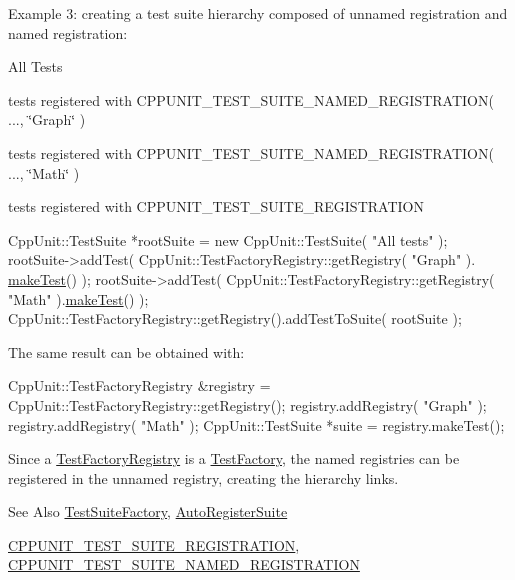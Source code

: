 Example 3\-: creating a test suite hierarchy composed of unnamed registration and named registration\-:
\begin{DoxyItemize}
\item All Tests
\begin{DoxyItemize}
\item tests registered with C\-P\-P\-U\-N\-I\-T\-\_\-\-T\-E\-S\-T\-\_\-\-S\-U\-I\-T\-E\-\_\-\-N\-A\-M\-E\-D\-\_\-\-R\-E\-G\-I\-S\-T\-R\-A\-T\-I\-O\-N( ..., \char`\"{}\-Graph\char`\"{} )
\item tests registered with C\-P\-P\-U\-N\-I\-T\-\_\-\-T\-E\-S\-T\-\_\-\-S\-U\-I\-T\-E\-\_\-\-N\-A\-M\-E\-D\-\_\-\-R\-E\-G\-I\-S\-T\-R\-A\-T\-I\-O\-N( ..., \char`\"{}\-Math\char`\"{} )
\item tests registered with C\-P\-P\-U\-N\-I\-T\-\_\-\-T\-E\-S\-T\-\_\-\-S\-U\-I\-T\-E\-\_\-\-R\-E\-G\-I\-S\-T\-R\-A\-T\-I\-O\-N
\end{DoxyItemize}
\end{DoxyItemize}


\begin{DoxyCode}
CppUnit::TestSuite *rootSuite = \textcolor{keyword}{new} CppUnit::TestSuite( \textcolor{stringliteral}{"All tests"} );
rootSuite->addTest( CppUnit::TestFactoryRegistry::getRegistry( \textcolor{stringliteral}{"Graph"} ).
      \hyperlink{class_test_factory_registry_a75fd01e6d565fb0f576ed1a887655089}{makeTest}() );
rootSuite->addTest( CppUnit::TestFactoryRegistry::getRegistry( \textcolor{stringliteral}{"Math"} ).\hyperlink{class_test_factory_registry_a75fd01e6d565fb0f576ed1a887655089}{makeTest}() );
CppUnit::TestFactoryRegistry::getRegistry().addTestToSuite( rootSuite );
\end{DoxyCode}


The same result can be obtained with\-: 
\begin{DoxyCode}
CppUnit::TestFactoryRegistry &registry = CppUnit::TestFactoryRegistry::getRegistry();
registry.addRegistry( \textcolor{stringliteral}{"Graph"} );
registry.addRegistry( \textcolor{stringliteral}{"Math"} );
CppUnit::TestSuite *suite = registry.makeTest();
\end{DoxyCode}


Since a \hyperlink{class_test_factory_registry}{Test\-Factory\-Registry} is a \hyperlink{class_test_factory}{Test\-Factory}, the named registries can be registered in the unnamed registry, creating the hierarchy links.

\begin{DoxySeeAlso}{See Also}
\hyperlink{class_test_suite_factory}{Test\-Suite\-Factory}, \hyperlink{class_auto_register_suite}{Auto\-Register\-Suite} 

\hyperlink{_helper_macros_8h_a2f4071eec88d1e306665ada0f2dd80e4}{C\-P\-P\-U\-N\-I\-T\-\_\-\-T\-E\-S\-T\-\_\-\-S\-U\-I\-T\-E\-\_\-\-R\-E\-G\-I\-S\-T\-R\-A\-T\-I\-O\-N}, \hyperlink{_helper_macros_8h_a028a5855a40ad3836e2a26aa48cd4c91}{C\-P\-P\-U\-N\-I\-T\-\_\-\-T\-E\-S\-T\-\_\-\-S\-U\-I\-T\-E\-\_\-\-N\-A\-M\-E\-D\-\_\-\-R\-E\-G\-I\-S\-T\-R\-A\-T\-I\-O\-N} 
\end{DoxySeeAlso}


